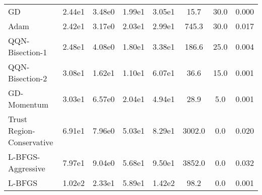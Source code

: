\documentclass{article}
\begin{document}
\begin{table}[htbp]
{\begin{tabular}{p{2.5cm}*{7}{c}}
GD & 2.44e1 & 3.48e0 & 1.99e1 & 3.05e1 & 15.7 & 30.0 & 0.000 \\
Adam & 2.42e1 & 3.17e0 & 2.03e1 & 2.99e1 & 745.3 & 30.0 & 0.017 \\
QQN-Bisection-1 & 2.48e1 & 4.08e0 & 1.80e1 & 3.38e1 & 186.6 & 25.0 & 0.004 \\
QQN-Bisection-2 & 3.08e1 & 1.62e1 & 1.10e1 & 6.07e1 & 36.6 & 15.0 & 0.001 \\
GD-Momentum & 3.03e1 & 6.57e0 & 2.04e1 & 4.94e1 & 28.9 & 5.0 & 0.001 \\
Trust Region-Conservative & 6.91e1 & 7.96e0 & 5.03e1 & 8.29e1 & 3002.0 & 0.0 & 0.020 \\
L-BFGS-Aggressive & 7.97e1 & 9.04e0 & 5.68e1 & 9.50e1 & 3852.0 & 0.0 & 0.032 \\
L-BFGS & 1.02e2 & 2.33e1 & 5.89e1 & 1.42e2 & 98.2 & 0.0 & 0.001 \\
\bottomrule
\end{tabular}
}
\end{table}
\end{document}
